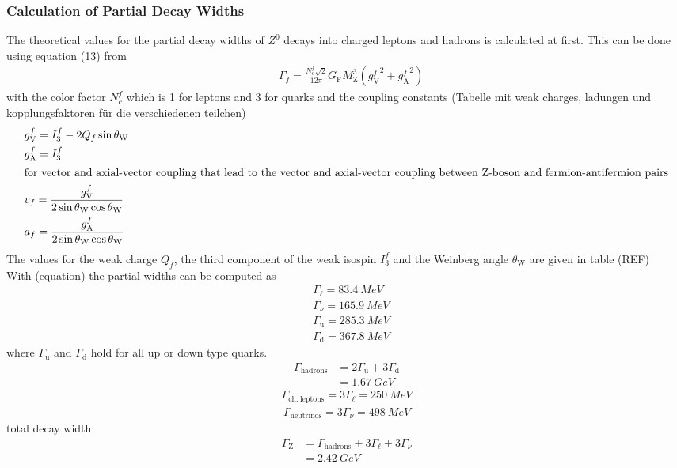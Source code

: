 \documentclass[11pt, a4paper]{article}
\numberwithin{equation}{section}
\newcommand{\korr}[1]{{\color{red}(#1)}}
\begin{document}
\subsubsection{Calculation of Partial Decay Widths}
\label{sec:calc_partial_width}
The theoretical values for the partial decay widths of $Z^0$ decays into charged leptons and hadrons is calculated at first.
This can be done using equation (13) from \cite{instructions}
\begin{align*}
	&\Gamma_f = \frac{N_\mathrm{c}^f \sqrt{2}}{12 \pi} G_\mathrm{F} M_\mathrm{Z}^3 \left( {g_\mathrm{V}^f}^2 + {g_\mathrm{A}^f}^2 \right)
\end{align*}
with the color factor $N_c^f$ which is 1 for leptons and 3 for quarks and the coupling constants
\korr{Tabelle mit weak charges, ladungen und kopplungsfaktoren für die verschiedenen teilchen}
\cite{instructions}
\begin{align*}
	&g_\mathrm{V}^f = I_3^f - 2 Q_f \sin\theta_\mathrm{W}\\
	&g_\mathrm{A}^f = I_3^f \\
	\intertext{for vector and axial-vector coupling that lead to the vector and axial-vector coupling between Z-boson and fermion-antifermion pairs}
	&v_f = \frac{g_\mathrm{V}^f}{2\sin\theta_\mathrm{W}\cos\theta_\mathrm{W}}\\
	&a_f = \frac{g_\mathrm{A}^f}{2\sin\theta_\mathrm{W}\cos\theta_\mathrm{W}}
\end{align*}
The values for the weak charge $Q_f$, the third component of the weak isospin $I_3^f$ and the Weinberg angle $\theta_\mathrm{W}$ are given in table \korr{REF}\\
With \korr{equation} the partial widths can be computed as
\begin{align*}
	&\Gamma_\ell = \SI{83.4}{MeV} \\
	&\Gamma_\nu = \SI{165.9}{MeV} \\
	&\Gamma_\mathrm{u} = \SI{285.3}{MeV} \\
	&\Gamma_\mathrm{d} = \SI{367.8}{MeV}
\end{align*}
where $\Gamma_\mathrm{u}$ and $\Gamma_\mathrm{d}$ hold for all up or down type quarks.
\begin{align*}
\Gamma_\mathrm{hadrons} &= 2\Gamma_\mathrm{u} + 3\Gamma_\mathrm{d} \\
&= \SI{1.67}{GeV}
\end{align*}
\begin{align*}
	\Gamma_\mathrm{ch.~leptons} = 3\Gamma_\ell = \SI{250}{MeV}
\end{align*}
\begin{align*}
	\Gamma_\mathrm{neutrinos} = 3\Gamma_\nu =\SI{498}{MeV}
\end{align*}
total decay width
\begin{align*}
	\Gamma_\mathrm{Z} &= \Gamma_\mathrm{hadrons} + 3 \Gamma_\ell + 3\Gamma_\nu \\
	&= \SI{2.42}{GeV}
\end{align*}
\end{document}
